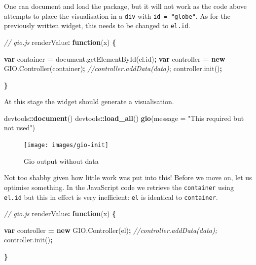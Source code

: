 \documentclass[10pt,]{krantz}
\makeatletter
\newenvironment{Shaded}{\begin{snugshade}}{\end{snugshade}}
\newcommand{\AttributeTok}[1]{\textcolor[rgb]{0.61,0.61,0.61}{#1}}
\newcommand{\CommentTok}[1]{\textcolor[rgb]{0.37,0.37,0.37}{\textit{#1}}}
\newcommand{\DataTypeTok}[1]{\textcolor[rgb]{0.27,0.27,0.27}{#1}}
\newcommand{\KeywordTok}[1]{\textcolor[rgb]{0.27,0.27,0.27}{\textbf{#1}}}
\newcommand{\NormalTok}[1]{#1}
\newcommand{\OperatorTok}[1]{\textcolor[rgb]{0.43,0.43,0.43}{\textbf{#1}}}
\newcommand{\StringTok}[1]{\textcolor[rgb]{0.5,0.5,0.5}{#1}}
\newcommand{\VariableTok}[1]{\textcolor[rgb]{0,0,0}{#1}}
\newenvironment{kframe}{%
\medskip{}
\setlength{\fboxsep}{.8em}
 \def\at@end@of@kframe{}%
 \ifinner\ifhmode%
  \def\at@end@of@kframe{\end{minipage}}%
  \begin{minipage}{\columnwidth}%
 \fi\fi%
 \def\FrameCommand##1{\hskip\@totalleftmargin \hskip-\fboxsep
 \colorbox{shadecolor}{##1}\hskip-\fboxsep
     \hskip-\linewidth \hskip-\@totalleftmargin \hskip\columnwidth}%
 \MakeFramed {\advance\hsize-\width
   \@totalleftmargin\z@ \linewidth\hsize
   \@setminipage}}%
 {\par\unskip\endMakeFramed%
 \at@end@of@kframe}
\renewenvironment{Shaded}{\begin{kframe}}{\end{kframe}}
\makeatother
\begin{document}
One can document and load the package, but it will not work as the code above attempts to place the visualisation in a \texttt{div} with \texttt{id\ =\ "globe"}. As for the previously written widget, this needs to be changed to \texttt{el.id}.

\begin{Shaded}
\begin{Highlighting}[]
\CommentTok{// gio.js}
\NormalTok{renderValue}\OperatorTok{:} \KeywordTok{function}\NormalTok{(x) }\OperatorTok{\{}

  \KeywordTok{var}\NormalTok{ container }\OperatorTok{=} \VariableTok{document}\NormalTok{.}\AttributeTok{getElementById}\NormalTok{(}\VariableTok{el}\NormalTok{.}\AttributeTok{id}\NormalTok{)}\OperatorTok{;}
  \KeywordTok{var}\NormalTok{ controller }\OperatorTok{=} \KeywordTok{new} \VariableTok{GIO}\NormalTok{.}\AttributeTok{Controller}\NormalTok{(container)}\OperatorTok{;}
  \CommentTok{//controller.addData(data);}
  \VariableTok{controller}\NormalTok{.}\AttributeTok{init}\NormalTok{()}\OperatorTok{;}

\OperatorTok{\}}
\end{Highlighting}
\end{Shaded}

At this stage the widget should generate a visualisation.

\begin{Shaded}
\begin{Highlighting}[]
\NormalTok{devtools}\OperatorTok{::}\KeywordTok{document}\NormalTok{()}
\NormalTok{devtools}\OperatorTok{::}\KeywordTok{load_all}\NormalTok{()}
\KeywordTok{gio}\NormalTok{(}\DataTypeTok{message =} \StringTok{"This required but not used"}\NormalTok{)}
\end{Highlighting}
\end{Shaded}

\begin{figure}[H]

{\centering \texttt{[image: images/gio-init]} 

}

\caption{Gio output without data}\label{fig:gio-init}
\end{figure}

Not too shabby given how little work was put into this! Before we move on, let us optimise something. In the JavaScript code we retrieve the \texttt{container} using \texttt{el.id} but this in effect is very inefficient: \texttt{el} is identical to \texttt{container}.

\begin{Shaded}
\begin{Highlighting}[]
\CommentTok{// gio.js}
\NormalTok{renderValue}\OperatorTok{:} \KeywordTok{function}\NormalTok{(x) }\OperatorTok{\{}

  \KeywordTok{var}\NormalTok{ controller }\OperatorTok{=} \KeywordTok{new} \VariableTok{GIO}\NormalTok{.}\AttributeTok{Controller}\NormalTok{(el)}\OperatorTok{;}
  \CommentTok{//controller.addData(data);}
  \VariableTok{controller}\NormalTok{.}\AttributeTok{init}\NormalTok{()}\OperatorTok{;}

\OperatorTok{\}}
\end{Highlighting}
\end{Shaded}
\end{document}
